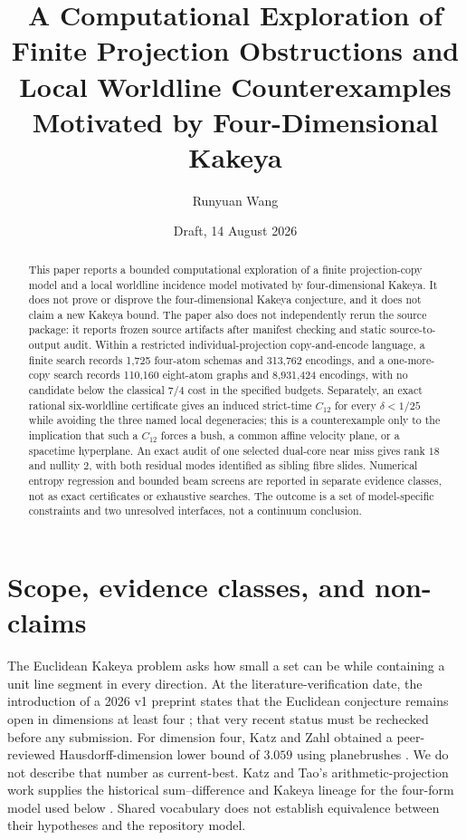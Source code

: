\documentclass[11pt]{article}
\title{A Computational Exploration of Finite Projection Obstructions and Local Worldline Counterexamples Motivated by Four-Dimensional Kakeya}
\author{Runyuan Wang}
\date{Draft, 14 August 2026}
\begin{document}
\maketitle

\begin{abstract}
This paper reports a bounded computational exploration of a finite projection-copy model and a local worldline incidence model motivated by four-dimensional Kakeya. It does not prove or disprove the four-dimensional Kakeya conjecture, and it does not claim a new Kakeya bound. The paper also does not independently rerun the source package: it reports frozen source artifacts after manifest checking and static source-to-output audit. Within a restricted individual-projection copy-and-encode language, a finite search records 1,725 four-atom schemas and 313,762 encodings, and a one-more-copy search records 110,160 eight-atom graphs and 8,931,424 encodings, with no candidate below the classical $7/4$ cost in the specified budgets. Separately, an exact rational six-worldline certificate gives an induced strict-time $C_{12}$ for every $\delta<1/25$ while avoiding the three named local degeneracies; this is a counterexample only to the implication that such a $C_{12}$ forces a bush, a common affine velocity plane, or a spacetime hyperplane. An exact audit of one selected dual-core near miss gives rank $18$ and nullity $2$, with both residual modes identified as sibling fibre slides. Numerical entropy regression and bounded beam screens are reported in separate evidence classes, not as exact certificates or exhaustive searches. The outcome is a set of model-specific constraints and two unresolved interfaces, not a continuum conclusion.
\end{abstract}

\section{Scope, evidence classes, and non-claims}

The Euclidean Kakeya problem asks how small a set can be while containing a unit line segment in every direction. At the literature-verification date, the introduction of a 2026 v1 preprint states that the Euclidean conjecture remains open in dimensions at least four \citep{JingWu2026CompactLieKakeya}; that very recent status must be rechecked before any submission. For dimension four, Katz and Zahl obtained a peer-reviewed Hausdorff-dimension lower bound of $3.059$ using planebrushes \citep{KatzZahl2021Planebrush}. We do not describe that number as current-best. Katz and Tao's arithmetic-projection work supplies the historical sum--difference and Kakeya lineage for the four-form model used below \citep{KatzTao1999ArithmeticProjections,KatzTao2002NewBounds}. Shared vocabulary does not establish equivalence between their hypotheses and the repository model.
\end{document}
